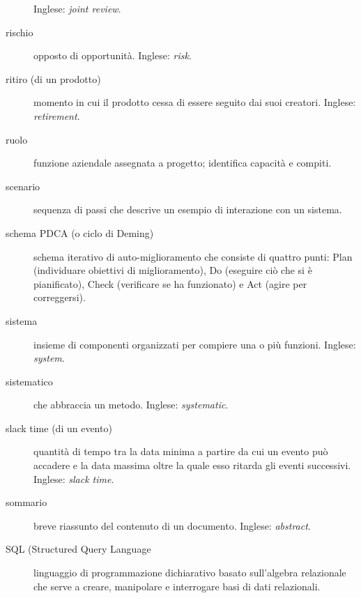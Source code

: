 \documentclass[a4paper]{article}
\begin{document}
\begin{description}
			 Inglese: \emph{joint review}.
			
	\item[rischio] 

			opposto di opportunità. Inglese: \emph{risk}.
			
	\item[ritiro (di un prodotto)] 

			momento in cui il prodotto cessa di essere seguito dai suoi creatori. Inglese: \emph{retirement}.
			
	\item[ruolo] 

			funzione aziendale assegnata a progetto; identifica capacità e compiti.
			
	\item[scenario] 

			sequenza di passi che descrive un esempio di interazione con un sistema.
			
	\item[schema PDCA (o ciclo di Deming)] 

			schema iterativo di auto-miglioramento che consiste di quattro punti: Plan (individuare obiettivi di miglioramento), Do (eseguire ciò che si è pianificato), Check (verificare se ha funzionato) e Act (agire per correggersi).
			
	\item[sistema] 

			insieme di componenti organizzati per compiere una o più funzioni. Inglese: \emph{system}.
			
	\item[sistematico] 

			che abbraccia un metodo. Inglese: \emph{systematic}.
			
	\item[slack time (di un evento)] 

			quantità di tempo tra la data minima a partire da cui un evento può accadere e la data massima oltre la quale esso ritarda gli eventi successivi. Inglese: \emph{slack time}.
			
	\item[sommario] 

			breve riassunto del contenuto di un documento. Inglese: \emph{abstract}.
			
	\item[SQL (Structured Query Language] 

			linguaggio di programmazione dichiarativo basato sull'algebra relazionale che serve a creare, manipolare e interrogare basi di dati relazionali.
			

\end{description}
\end{document}
